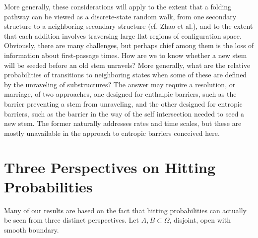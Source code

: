 \documentclass[nofootinbib,english, aip, jcp, priprint, graphicx,floatfix]{revtex4-1}
\theoremstyle{plain}
\theoremstyle{definition}
\theoremstyle{plain}
\begin{document}
More generally, these considerations will apply to the extent that a folding pathway can be viewed as 
a discrete-state random walk, from one secondary structure to a neighboring secondary structure (cf. Zhao et al.\cite{Zhao2010-zipping}),
and to the extent that each addition involves traversing large flat regions of configuration space. Obviously, there are many challenges, but perhaps chief among them is the loss of information about first-passage times. How are we to know whether a new stem will be seeded before an old stem unravels? More generally, what are the relative probabilities of transitions to neighboring states when some of these are defined by the unraveling of substructures? The answer may require a resolution, or marriage, of two approaches, one designed for enthalpic barriers, such as the barrier preventing a stem from unraveling, and the other designed for entropic barriers, such as the barrier in the way of the self intersection needed to seed a new stem. The former naturally addresses rates and time scales, but these are mostly unavailable in the approach to entropic barriers conceived here.


\newpage
\appendix
{}


                                                         
\section{Three Perspectives on Hitting Probabilities}
\label{sec:three_perspectives}

Many of our results are based on the fact that hitting probabilities can actually be seen from three distinct perspectives.  Let $A,B\subset \Omega$, disjoint, open with smooth boundary.  
\end{document}
